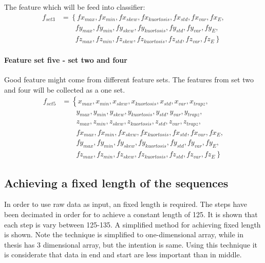 \documentclass[USenglish]{ifimaster}  %
\begin{document}
The feature which will be feed into classifier:
\begin{align}
 f_{set3} &= \left\{ fx_{max},fx_{min},fx_{skew},fx_{kuortosis},fx_{std},fx_{var},fx_{E}, \right.\nonumber\\
 &\qquad \left. {} fy_{max},fy_{min},fy_{skew},fy_{kuortosis},fy_{std},fy_{var},fy_{E}, \right.\nonumber\\
 &\qquad \left. {} fz_{max},fz_{min},fz_{skew},fz_{kuortosis},fz_{std},fz_{var},fz_{E} \right\}
\end{align}

\paragraph{Feature set five - set two and four} Good feature might come from different feature sets. The features from set two and four will be collected as a one set. 
\begin{align}
f_{set5} &= \left\{ x_{max},x_{min},x_{skew},x_{kuortosis},x_{std},x_{var},x_{trapz}, \right.\nonumber\\
&\qquad \left. {}  y_{max},y_{min},y_{skew},y_{kuortosis},y_{std},y_{var},y_{trapz}, \right.\nonumber\\
&\qquad \left. {}  z_{max},z_{min},z_{skew},z_{kuortosis},z_{std},z_{var},z_{trapz}, \right.\nonumber\\
&\qquad \left. {} fx_{max},fx_{min},fx_{skew},fx_{kuortosis},fx_{std},fx_{var},fx_{E}, \right.\nonumber\\
&\qquad \left. {} fy_{max},fy_{min},fy_{skew},fy_{kuortosis},fy_{std},fy_{var},fy_{E}, \right.\nonumber\\
&\qquad \left. {} fz_{max},fz_{min},fz_{skew},fz_{kuortosis},fz_{std},fz_{var},fz_{E} \right\}
\end{align}

\subsection{Achieving a fixed length of the sequences} \label{subseq:FixLength}
In order to use raw data as input, an fixed length is required. The steps have been decimated in order for to achieve a constant length of 125. It is shown that each step is vary between 125-135. A simplified method for achieving fixed length is shown. Note the technique is simplified to one-dimensional array, while in thesis has 3 dimensional array, but the intention is same. Using this technique it is considerate that data in end and start are less important than in middle.
  
\end{document}
